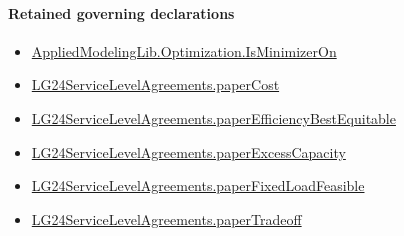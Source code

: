 \documentclass[10pt]{article}
\begin{document}
\paragraph{Retained governing declarations}
\begin{itemize}\raggedright
\item \hyperlink{governing-declaration-797bcd85b4b26271}{Applied\allowbreak{}Modeling\allowbreak{}Lib.\allowbreak{}Optimization.\allowbreak{}Is\allowbreak{}Minimizer\allowbreak{}On}
\item \hyperlink{governing-declaration-c94ee3dd07c6b492}{LG24\allowbreak{}Service\allowbreak{}Level\allowbreak{}Agreements.\allowbreak{}paper\allowbreak{}Cost}
\item \hyperlink{governing-declaration-e3687614c9582751}{LG24\allowbreak{}Service\allowbreak{}Level\allowbreak{}Agreements.\allowbreak{}paper\allowbreak{}Efficiency\allowbreak{}Best\allowbreak{}Equitable}
\item \hyperlink{governing-declaration-cfc6c9e8c89655cd}{LG24\allowbreak{}Service\allowbreak{}Level\allowbreak{}Agreements.\allowbreak{}paper\allowbreak{}Excess\allowbreak{}Capacity}
\item \hyperlink{governing-declaration-862f3b4b0c8cef67}{LG24\allowbreak{}Service\allowbreak{}Level\allowbreak{}Agreements.\allowbreak{}paper\allowbreak{}Fixed\allowbreak{}Load\allowbreak{}Feasible}
\item \hyperlink{governing-declaration-e97abe374e080da1}{LG24\allowbreak{}Service\allowbreak{}Level\allowbreak{}Agreements.\allowbreak{}paper\allowbreak{}Tradeoff}
\end{itemize}
\end{document}
